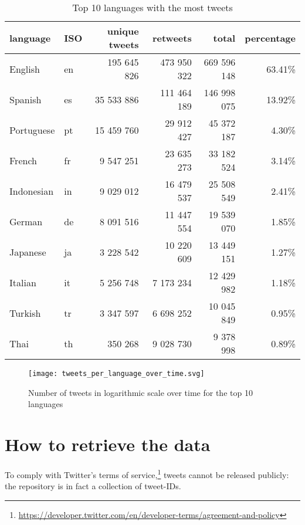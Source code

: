 \begin{table}[H]
    \centering
    \begin{tabularx}{\columnwidth}{@{}XXrrrr@{}}
    		\bottomrule
    		\textbf{language} & \textbf{ISO} & \textbf{unique tweets} & \textbf{retweets} & \textbf{total} & \textbf{percentage} \\
    		\midrule
        English & en & 195 645 826 & 473 950 322 & 669 596 148 & 63.41\% 
        \\
		Spanish & es & 35 533 886 & 111 464 189 & 146 998 075 & 13.92\% 
		\\
		Portuguese & pt & 15 459 760 & 29 912 427 & 45 372 187 & 4.30\% 
		\\
		French & fr & 9 547 251 & 23 635 273 & 33 182 524 & 3.14\% 
		\\
		Indonesian & in & 9 029 012 & 16 479 537 & 25 508 549 & 2.41\%
		\\
		German & de & 8 091 516 & 11 447 554 & 19 539 070 & 1.85\%
		\\
		Japanese & ja & 3 228 542 & 10 220 609 & 13 449 151 & 1.27\%
		\\
		Italian & it & 5 256 748 & 7 173 234 & 12 429 982 & 1.18\%
		\\
		Turkish & tr & 3 347 597 & 6 698 252 & 10 045 849 & 0.95\%
		\\
		Thai & th & 350 268 & 9 028 730 & 9 378 998 & 0.89\%
		\\
		\bottomrule
    \end{tabularx}
    \caption{Top 10 languages with the most tweets}
    \label{tab:dataset-language-stats}
\end{table}

\begin{figure}[H]
	\centering
    	\texttt{[image: tweets\_per\_language\_over\_time.svg]}
    	\caption{Number of tweets in logarithmic scale over time for the top 10 languages}
    	\label{fig:tweets-language-over-time}
\end{figure}

\section{How to retrieve the data}
\label{sec:retrieve-data}

To comply with Twitter's terms of service,\footnote{\url{https://developer.twitter.com/en/developer-terms/agreement-and-policy}} tweets cannot be released publicly: the repository is in fact a collection of tweet-IDs.

